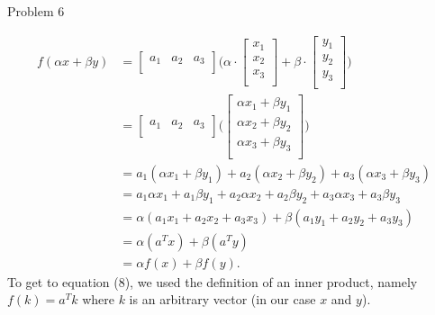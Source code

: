 \begin{problem}{Problem 6}
\begin{Highlight}
        \begin{align}
            f(\alpha x + \beta y) & = 
            \begin{bmatrix}
                a_{1} & a_{2} & a_{3} \\
            \end{bmatrix}
            \Bigg(
            \alpha \cdot 
            \begin{bmatrix}
                x_{1} \\
                x_{2} \\
                x_{3} \\
            \end{bmatrix}
            + \beta \cdot
            \begin{bmatrix}
                y_{1} \\
                y_{2} \\
                y_{3} \\
            \end{bmatrix}
            \Bigg) \\
            & = 
            \begin{bmatrix}
                a_{1} & a_{2} & a_{3} \\
            \end{bmatrix}
            \Bigg(
            \begin{bmatrix}
                \alpha x_{1} + \beta y_{1} \\
                \alpha x_{2} + \beta y_{2} \\
                \alpha x_{3} + \beta y_{3} \\
            \end{bmatrix}
            \Bigg) \\
            & = a_{1}(\alpha x_{1} + \beta y_{1}) + a_{2}(\alpha x_{2} + \beta y_{2}) + a_{3}(\alpha x_{3} + \beta y_{3}) \\
            & = a_{1} \alpha x_{1} + a_{1} \beta y_{1} + a_{2} \alpha x_{2} + a_{2} \beta y_{2} + a_{3} \alpha x_{3} + a_{3} \beta y_{3} \\
            & = \alpha(a_{1}x_{1} + a_{2}x_{2} + a_{3}x_{3}) + \beta(a_{1}y_{1} + a_{2}y_{2} + a_{3}y_{3}) \\
            & = \alpha (a^{T}x) + \beta (a^{T}y) \\
            & = \alpha f(x) + \beta f(y).
        \end{align}
        To get to equation (8), we used the definition of an inner product, namely $f(k) = a^{T}k$ where $k$ is an arbitrary vector (in our case $x$ and $y$).


\end{Highlight}
\end{problem}
